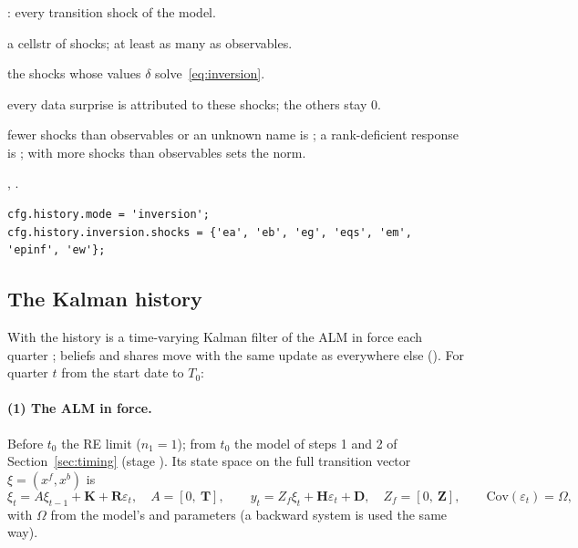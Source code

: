 \documentclass[11pt,a4paper]{article}
\DeclareRobustCommand{\codem}[1]{\texttt{\detokenize{#1}}}
\newenvironment{optspec}%
  {\begin{description}[style=sameline,leftmargin=2.7cm,labelwidth=2.5cm,font=\normalfont\itshape]}%
  {\end{description}}
\newcommand{\T}{\mathbf{T}}
\newcommand{\K}{\mathbf{K}}
\newcommand{\Rs}{\mathbf{R}}
\newcommand{\Z}{\mathbf{Z}}
\newcommand{\Hs}{\mathbf{H}}
\newcommand{\D}{\mathbf{D}}
\begin{document}
\subsubsection{\texorpdfstring{\codem{history.inversion.shocks}}{history.inversion.shocks}}\label{opt:history-inversion-shocks}
\begin{optspec}
  \item[Default] \code{{}}: every transition shock of the model.
  \item[Values] a cellstr of shocks; at least as many as observables.
  \item[Math] the shocks whose values $\delta$ solve~\eqref{eq:inversion}.
  \item[Assumptions] every data surprise is attributed to these shocks; the others stay 0.
  \item[Interactions] fewer shocks than observables or an unknown name is
        ; a rank-deficient response is
        ; with more shocks than observables
         sets the norm.
  \item[Code] , .
  \item[Example]
\begin{lstlisting}
cfg.history.mode = 'inversion';
cfg.history.inversion.shocks = {'ea', 'eb', 'eg', 'eqs', 'em', 'epinf', 'ew'};
\end{lstlisting}
\end{optspec}

\subsection{The Kalman history}\label{sec:kalman}

With  the history is a time-varying Kalman filter of the ALM in force
each quarter \citep[see][for the filter]{durbin2012}; beliefs and shares move with the same update
as everywhere else (). For quarter $t$ from the start date to $T_0$:

\paragraph{(1) The ALM in force.} Before $t_0$ the RE limit ($n_1 = 1$); from $t_0$ the model of
steps 1 and 2 of Section~\ref{sec:timing} (stage ). Its state space on the full transition vector
$\xi = (x^f, x^b)$ is
\begin{equation}\label{eq:kalss}
  \xi_t = A\xi_{t-1} + \K + \Rs\varepsilon_t,\quad A = [0,\ \T],\qquad
  y_t = Z_f\xi_t + \Hs\varepsilon_t + \D,\quad Z_f = [0,\ \Z],\qquad \mathrm{Cov}(\varepsilon_t) = \Omega,
\end{equation}
with $\Omega$ from the model's  and  parameters (a backward system is used
the same way).
\end{document}
